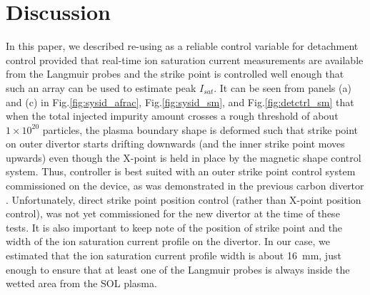 \section{Discussion}
\label{sec:discussion}

In this paper, we described re-using \Afrac as a reliable control variable for detachment control provided that real-time ion saturation current measurements are available from the Langmuir probes and the strike point is controlled well enough that such an array can be used to estimate peak $I_{sat}$.
It can be seen from panels (a) and (c) in Fig.\ref{fig:sysid_afrac}, Fig.\ref{fig:sysid_sm}, and Fig.\ref{fig:detctrl_sm} that when the total injected impurity amount crosses a rough threshold of about $1\times10^{20}$ particles, the plasma boundary shape is deformed such that strike point on outer divertor starts drifting downwards (and the inner strike point moves upwards) even though the X-point is held in place by the magnetic shape control system.
Thus, \Afrac controller is best suited with an outer strike point control system commissioned on the device, as was demonstrated in the previous carbon divertor \cite{Eldon_2022_PPCF}.
Unfortunately, direct strike point position control (rather than X-point position control), was not yet commissioned for the new divertor at the time of these tests.
It is also important to keep note of the position of strike point and the width of the ion saturation current profile on the divertor.
In our case, we estimated that the ion saturation current profile width is about 16~mm, just enough to ensure that at least one of the Langmuir probes is always inside the wetted area from the \ac{SOL} plasma.
